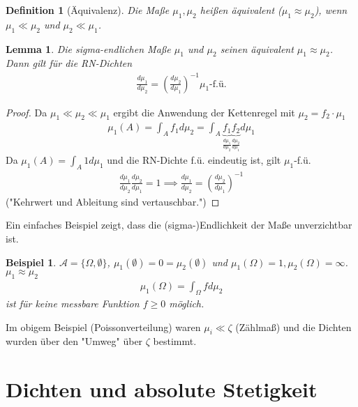 \documentclass[]{article}
\newtheorem{lemma}{Lemma}
\newtheorem{definition}{Definition}
\newtheorem*{example}{Beispiel}
\begin{document}
\begin{definition}[Äquivalenz]
	Die Maße $\mu_1, \mu_2$ heißen äquivalent ($\mu_1 \approx \mu_2$), wenn $\mu_1 \ll \mu_2$ und $\mu_2 \ll \mu_1$.
\end{definition}

\begin{lemma}
	Die sigma-endlichen Maße $\mu_1$ und $\mu_2$ seinen äquivalent $\mu_1 \approx \mu_2$. Dann gilt für die RN-Dichten
	\begin{align*}
		\frac{d\mu_1}{d\mu_2} = \left(\frac{d\mu_2}{d\mu_1}\right)^{-1} \mu_1\text{-f.ü.}
	\end{align*}
\end{lemma}
\begin{proof}
	Da $\mu_1 \ll \mu_2 \ll \mu_1$ ergibt die Anwendung der Kettenregel mit $\mu_2 = f_2 \cdot \mu_1$
	\begin{align*}
		\mu_1(A) = \int_A f_1 d\mu_2 = \int_A \underbrace{f_1}_{\frac{d\mu_1}{d\mu_2}} \underbrace{f_2}_{\frac{d\mu_2}{d\mu_1}} d\mu_1
	\end{align*}
	Da $\mu_1(A) = \int_A 1d\mu_1$ und die RN-Dichte f.ü. eindeutig ist, gilt $\mu_1$-f.ü.
	\begin{align*}
		\frac{d\mu_1}{d\mu_2} \frac{d\mu_2}{d\mu_1} = 1 \implies \frac{d\mu_1}{d\mu_2} = \left(\frac{d\mu_2}{d\mu_1}\right)^{-1}
	\end{align*}
	("Kehrwert und Ableitung sind vertauschbar.")
\end{proof}

Ein einfaches Beispiel zeigt, dass die (sigma-)Endlichkeit der Maße unverzichtbar ist.

\begin{example}
	$\mathcal{A}=\{\Omega,\emptyset\}$, $\mu_1(\emptyset) = 0 = \mu_2(\emptyset)$ und $\mu_1(\Omega) = 1, \mu_2(\Omega) = \infty$. $\mu_1 \approx \mu_2$
	\begin{align*}
		\mu_1(\Omega) = \int_\Omega f d\mu_2
	\end{align*}
	ist für keine messbare Funktion $f \geq 0$ möglich.
\end{example}

Im obigem Beispiel (Poissonverteilung) waren $\mu_i \ll \zeta$ (Zählmaß) und die Dichten wurden über den "Umweg" über $\zeta$ bestimmt.

\section{Dichten und absolute Stetigkeit}
\end{document}
